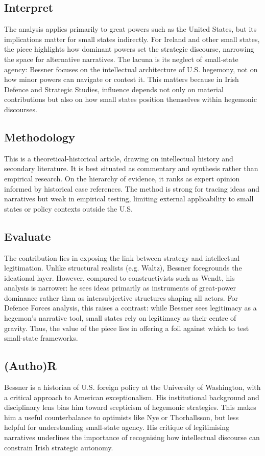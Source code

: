 \subsection*{Interpret}
The analysis applies primarily to great powers such as the United States, but its implications matter for small states indirectly. For Ireland and other small states, the piece highlights how dominant powers set the strategic discourse, narrowing the space for alternative narratives. The lacuna is its neglect of small-state agency: Bessner focuses on the intellectual architecture of U.S. hegemony, not on how minor powers can navigate or contest it. This matters because in Irish Defence and Strategic Studies, influence depends not only on material contributions but also on how small states position themselves within hegemonic discourses.

\subsection*{Methodology}
This is a theoretical-historical article, drawing on intellectual history and secondary literature. It is best situated as commentary and synthesis rather than empirical research. On the hierarchy of evidence, it ranks as expert opinion informed by historical case references. The method is strong for tracing ideas and narratives but weak in empirical testing, limiting external applicability to small states or policy contexts outside the U.S.

\subsection*{Evaluate}
The contribution lies in exposing the link between strategy and intellectual legitimation. Unlike structural realists (e.g. Waltz), Bessner foregrounds the ideational layer. However, compared to constructivists such as Wendt, his analysis is narrower: he sees ideas primarily as instruments of great-power dominance rather than as intersubjective structures shaping all actors. For Defence Forces analysis, this raises a contrast: while Bessner sees legitimacy as a hegemon’s narrative tool, small states rely on legitimacy as their centre of gravity. Thus, the value of the piece lies in offering a foil against which to test small-state frameworks.

\subsection*{(Autho)R}
Bessner is a historian of U.S. foreign policy at the University of Washington, with a critical approach to American exceptionalism. His institutional background and disciplinary lens bias him toward scepticism of hegemonic strategies. This makes him a useful counterbalance to optimists like Nye or Thorhallsson, but less helpful for understanding small-state agency. His critique of legitimising narratives underlines the importance of recognising how intellectual discourse can constrain Irish strategic autonomy.

